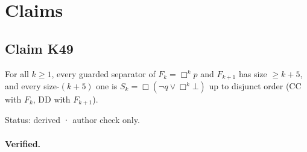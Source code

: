 \documentclass{article}
\begin{document}
\section{Claims}

\subsection*{Claim K49}

For all $k\ge1$, every guarded separator of $F_k=\Box^kp$ and $F_{k+1}$ has size $\ge k+5$, and every size-$(k+5)$ one is $S_k=\Box(\neg q\vee\Box^k\bot)$ up to disjunct order (CC with $F_k$, DD with $F_{k+1}$).

Status: derived · author check only.

\paragraph{Verified.}
\end{document}
